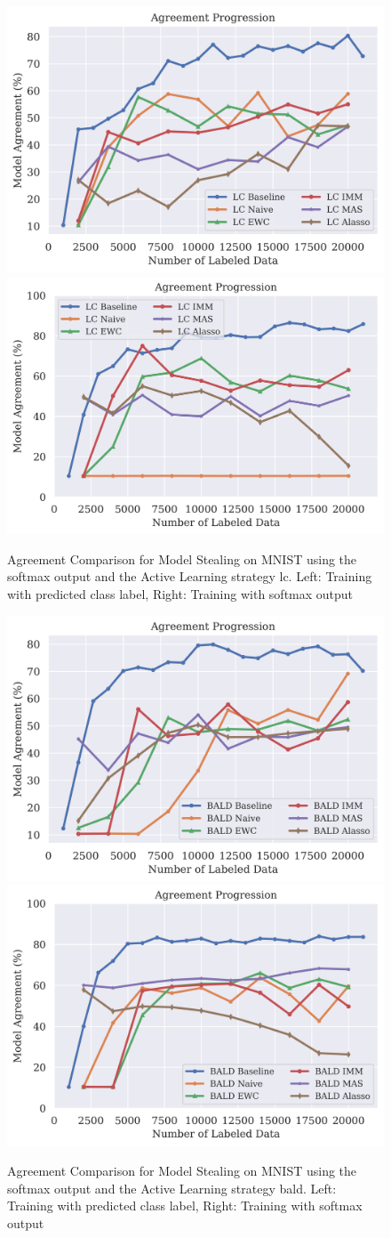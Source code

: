 \begin{figure}[!htb]
    \centering
    \includegraphics[width=0.48\linewidth]{images/results_CALMS/mnist_label_lc.png} \hfill
    \includegraphics[width=0.48\linewidth]{images/results_CALMS/mnist_softmax_lc.png}
    \caption{Agreement Comparison for Model Stealing on MNIST using the softmax output and the Active Learning strategy \gls{lc}. Left: Training with predicted class label,
    Right: Training with softmax output}
    \label{fig:CALMSMNISTLC}
\end{figure}

\begin{figure}[!htb]
    \centering
    \includegraphics[width=0.48\linewidth]{images/results_CALMS/mnist_label_bald.png} \hfill
    \includegraphics[width=0.48\linewidth]{images/results_CALMS/mnist_softmax_bald.png}
    \caption{Agreement Comparison for Model Stealing on MNIST using the softmax output and the Active Learning strategy \gls{bald}. Left: Training with predicted class label,
    Right: Training with softmax output}
    \label{fig:CALMSMNISTBALD}
\end{figure}


